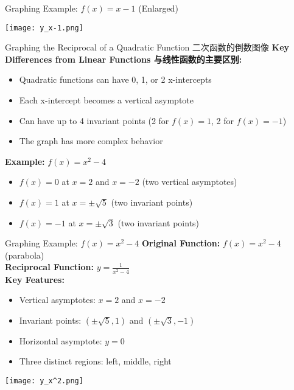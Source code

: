 \documentclass[aspectratio=169]{beamer}
\begin{document}
\begin{frame}{Graphing Example: $f(x) = x - 1$ (Enlarged)}
    \begin{center}
        \texttt{[image: y\_x-1.png]}
    \end{center}
\end{frame}

\begin{frame}{Graphing the Reciprocal of a Quadratic Function 二次函数的倒数图像}
    \footnotesize
    \textbf{Key Differences from Linear Functions 与线性函数的主要区别:}
    \begin{itemize}
        \item Quadratic functions can have 0, 1, or 2 x-intercepts
        \item Each x-intercept becomes a vertical asymptote
        \item Can have up to 4 invariant points (2 for $f(x) = 1$, 2 for $f(x) = -1$)
        \item The graph has more complex behavior
    \end{itemize}
    \vspace{1em}
    \textbf{Example:} $f(x) = x^2 - 4$
    \begin{itemize}
        \item $f(x) = 0$ at $x = 2$ and $x = -2$ (two vertical asymptotes)
        \item $f(x) = 1$ at $x = \pm\sqrt{5}$ (two invariant points)
        \item $f(x) = -1$ at $x = \pm\sqrt{3}$ (two invariant points)
    \end{itemize}
\end{frame}

\begin{frame}{Graphing Example: $f(x) = x^2 - 4$}
    \footnotesize
    \textbf{Original Function:} $f(x) = x^2 - 4$ (parabola)\\
    \textbf{Reciprocal Function:} $y = \frac{1}{x^2 - 4}$\\
    \vspace{1em}
    \textbf{Key Features:}
    \begin{itemize}
        \item Vertical asymptotes: $x = 2$ and $x = -2$
        \item Invariant points: $(\pm\sqrt{5}, 1)$ and $(\pm\sqrt{3}, -1)$
        \item Horizontal asymptote: $y = 0$
        \item Three distinct regions: left, middle, right
    \end{itemize}
    \vspace{0.3em}
    \begin{center}
        \texttt{[image: y\_x^2.png]}
    \end{center}
\end{frame}
\end{document}
